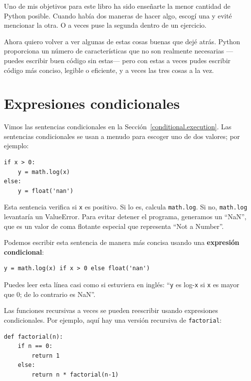 \documentclass[10pt]{book}
\begin{document}
Uno de mis objetivos para este libro ha sido enseñarte la menor cantidad de Python
posible.  Cuando había dos maneras de hacer algo, escogí
una y evité mencionar la otra.  O a veces puse la segunda
dentro de un ejercicio.

Ahora quiero volver a ver algunas de estas cosas buenas que dejé atrás.
Python proporciona un número de características que no son realmente necesarias ---puedes
escribir buen código sin estas--- pero con estas a veces pudes
escribir código más conciso, legible o eficiente, y a veces
las tres cosas a la vez.


\section{Expresiones condicionales}

Vimos las sentencias condicionales en la Sección~\ref{conditional.execution}.
Las sentencias condicionales se usan a menudo para escoger uno de dos valores;
por ejemplo:

\begin{verbatim}
if x > 0:
    y = math.log(x)
else:
    y = float('nan')
\end{verbatim}

Esta sentencia verifica si {\tt x} es positivo.  Si lo es, calcula
{\tt math.log}.  Si no, {\tt math.log} levantaría un ValueError.  Para
evitar detener el programa, generamos un ``NaN'', que es un valor
de coma flotante especial que representa ``Not a Number''.

Podemos escribir esta sentencia de manera más concisa usando una {\bf expresión
condicional}:

\begin{verbatim}
y = math.log(x) if x > 0 else float('nan')
\end{verbatim}

Puedes leer esta línea casi como si estuviera en inglés: ``{\tt y} es log-{\tt x}
si {\tt x} es mayor que 0; de lo contrario es NaN''.

Las funciones recursivas a veces se pueden reescribir usando expresiones
condicionales.  Por ejemplo, aquí hay una versión recursiva de {\tt factorial}:

\begin{verbatim}
def factorial(n):
    if n == 0:
        return 1
    else:
        return n * factorial(n-1)
\end{verbatim}
\end{document}
